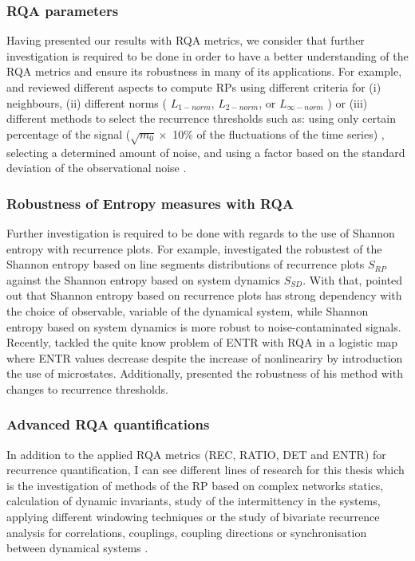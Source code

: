 \subsubsection*{RQA parameters}
Having presented our results with RQA metrics, we consider that further 
investigation is required to be done in order to have a better 
understanding of the RQA metrics and ensure its robustness in many of 
its applications. 
For example, \cite{marwan2007} and 
\cite{marwan2015} reviewed different aspects to 
compute RPs using different criteria for (i) neighbours, 
(ii) different norms ( $L_{1-norm}$, $L_{2-norm}$, or $L_{\infty-norm}$ ) or 
(iii) different methods to select the recurrence thresholds such as: 
using only certain percentage of the signal
($\sqrt{m_0} \times$ 10\% of the fluctuations of the time series)
\citep{letellier2006}, selecting a determined amount of noise, and 
using a factor based on the standard deviation of the 
observational noise \cite{marwan2007}.



\subsubsection*{Robustness of Entropy measures with RQA}
Further investigation is required to be done with regards to
the use of Shannon entropy with recurrence plots.
For example, \cite{letellier2006} investigated the robustest of 
the Shannon entropy based on line segments distributions of 
recurrence plots $S_{RP}$ 
against the Shannon entropy based on system dynamics $S_{SD}$.
With that, \cite{letellier2006} pointed out that Shannon entropy based on 
recurrence plots has strong dependency with the choice of observable,
variable of the dynamical system, while Shannon entropy based on system dynamics 
is more robust to noise-contaminated signals.
Recently, \cite{corso2017} tackled the quite know problem of ENTR with RQA
in a logistic map \citep{marwan2007} where ENTR values decrease despite the 
increase of nonlineariry by introduction the use of microstates. 
Additionally, \cite{corso2017} presented the robustness of his method 
with changes to recurrence thresholds.


\subsubsection*{Advanced RQA quantifications}
In addition to the applied RQA metrics (REC, RATIO, DET and ENTR) for 
recurrence quantification, I can see different lines of research for this 
thesis which is the investigation of methods of the RP based on 
complex networks statics, calculation of dynamic invariants, 
study of the intermittency in the systems, 
applying different windowing techniques or 
the study of bivariate recurrence analysis for correlations, 
couplings, coupling directions or synchronisation between dynamical systems
\citep{marwan2007, marwan2015}.



